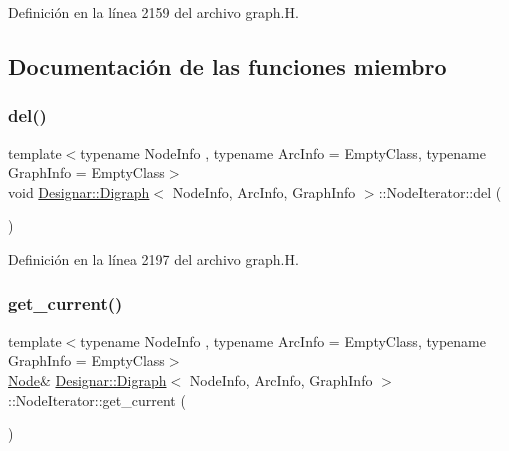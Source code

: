 Definición en la línea 2159 del archivo graph.\+H.



\subsection{Documentación de las funciones miembro}
\mbox{\label{class_designar_1_1_digraph_1_1_node_iterator_a8d68d82384631f601055ef9b742b0dbf}} 
\subsubsection{\texorpdfstring{del()}{del()}}
{\footnotesize\ttfamily template$<$typename Node\+Info , typename Arc\+Info  = Empty\+Class, typename Graph\+Info  = Empty\+Class$>$ \\
void \hyperlink{class_designar_1_1_digraph}{Designar\+::\+Digraph}$<$ Node\+Info, Arc\+Info, Graph\+Info $>$\+::Node\+Iterator\+::del (\begin{DoxyParamCaption}{ }\end{DoxyParamCaption})\hspace{0.3cm}{\ttfamily [inline]}}



Definición en la línea 2197 del archivo graph.\+H.

\mbox{\label{class_designar_1_1_digraph_1_1_node_iterator_a2d9961869a4ec52a112354600094646c}} 
\subsubsection{\texorpdfstring{get\+\_\+current()}{get\_current()}\hspace{0.1cm}{\footnotesize\ttfamily [1/2]}}
{\footnotesize\ttfamily template$<$typename Node\+Info , typename Arc\+Info  = Empty\+Class, typename Graph\+Info  = Empty\+Class$>$ \\
\hyperlink{class_designar_1_1_digraph_a4dc921c41a480b7946a04170e997d8ae}{Node}\& \hyperlink{class_designar_1_1_digraph}{Designar\+::\+Digraph}$<$ Node\+Info, Arc\+Info, Graph\+Info $>$\+::Node\+Iterator\+::get\+\_\+current (\begin{DoxyParamCaption}{ }\end{DoxyParamCaption})\hspace{0.3cm}{\ttfamily [inline]}}



